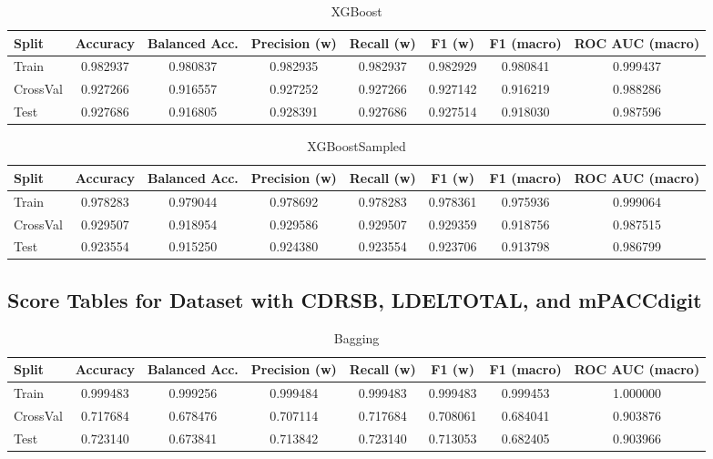 \begin{table}[H]
	\centering
	\caption{XGBoost}
	\begin{adjustbox}{max width=\textwidth}
		\begin{tabular}{lccccccc}
			\toprule
			Split & Accuracy & Balanced Acc. & Precision (w) & Recall (w) & F1 (w) & F1 (macro) & ROC AUC (macro) \\
			\midrule
			Train & 0.982937 & 0.980837 & 0.982935 & 0.982937 & 0.982929 & 0.980841 & 0.999437 \\
			CrossVal & 0.927266 & 0.916557 & 0.927252 & 0.927266 & 0.927142 & 0.916219 & 0.988286 \\
			Test & 0.927686 & 0.916805 & 0.928391 & 0.927686 & 0.927514 & 0.918030 & 0.987596 \\
			\bottomrule
		\end{tabular}
	\end{adjustbox}
\end{table}

\begin{table}[H]
	\centering
	\caption{XGBoostSampled}
	\begin{adjustbox}{max width=\textwidth}
		\begin{tabular}{lccccccc}
			\toprule
			Split & Accuracy & Balanced Acc. & Precision (w) & Recall (w) & F1 (w) & F1 (macro) & ROC AUC (macro) \\
			\midrule
			Train & 0.978283 & 0.979044 & 0.978692 & 0.978283 & 0.978361 & 0.975936 & 0.999064 \\
			CrossVal & 0.929507 & 0.918954 & 0.929586 & 0.929507 & 0.929359 & 0.918756 & 0.987515 \\
			Test & 0.923554 & 0.915250 & 	0.924380 & 0.923554 & 0.923706 & 0.913798 & 0.986799 \\
			\bottomrule
		\end{tabular}
	\end{adjustbox}
\end{table}

\subsection{Score Tables for Dataset with CDRSB, LDELTOTAL, and mPACCdigit}
\begin{table}[H]
	\centering
	\caption{Bagging}
	\begin{adjustbox}{max width=\textwidth}
		\begin{tabular}{lccccccc}
			\toprule
			Split & Accuracy & Balanced Acc. & Precision (w) & Recall (w) & F1 (w) & F1 (macro) & ROC AUC (macro) \\
			\midrule
			Train & 0.999483 & 0.999256 & 0.999484 & 0.999483 & 0.999483 & 0.999453 & 1.000000 \\
			CrossVal & 0.717684 & 0.678476 & 0.707114 & 0.717684 & 0.708061 & 0.684041 & 0.903876 \\
			Test & 0.723140 & 0.673841 & 0.713842 & 0.723140 & 0.713053 & 0.682405 & 0.903966 \\
			\bottomrule
		\end{tabular}
	\end{adjustbox}
\end{table}

